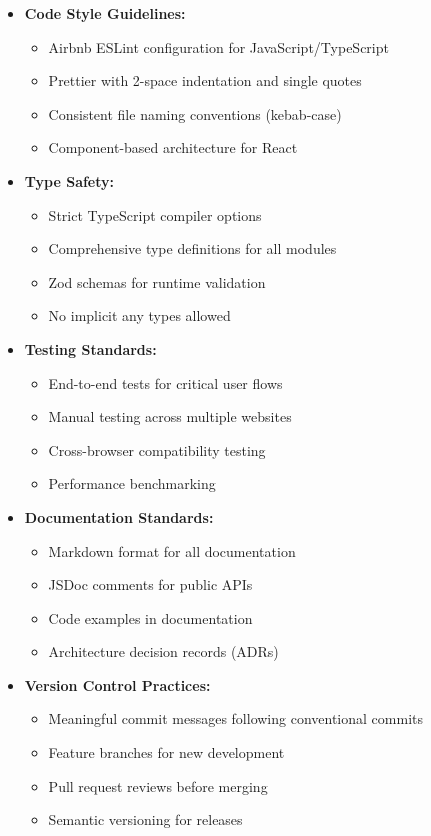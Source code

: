\documentclass[12pt,a4paper]{article}
\begin{document}
\begin{itemize}
    \item \textbf{Code Style Guidelines:}
    \begin{itemize}
        \item Airbnb ESLint configuration for JavaScript/TypeScript
        \item Prettier with 2-space indentation and single quotes
        \item Consistent file naming conventions (kebab-case)
        \item Component-based architecture for React
    \end{itemize}
    
    \item \textbf{Type Safety:}
    \begin{itemize}
        \item Strict TypeScript compiler options
        \item Comprehensive type definitions for all modules
        \item Zod schemas for runtime validation
        \item No implicit any types allowed
    \end{itemize}
    
    \item \textbf{Testing Standards:}
    \begin{itemize}
        \item End-to-end tests for critical user flows
        \item Manual testing across multiple websites
        \item Cross-browser compatibility testing
        \item Performance benchmarking
    \end{itemize}
    
    \item \textbf{Documentation Standards:}
    \begin{itemize}
        \item Markdown format for all documentation
        \item JSDoc comments for public APIs
        \item Code examples in documentation
        \item Architecture decision records (ADRs)
    \end{itemize}
    
    \item \textbf{Version Control Practices:}
    \begin{itemize}
        \item Meaningful commit messages following conventional commits
        \item Feature branches for new development
        \item Pull request reviews before merging
        \item Semantic versioning for releases
    \end{itemize}
\end{itemize}
\end{document}
